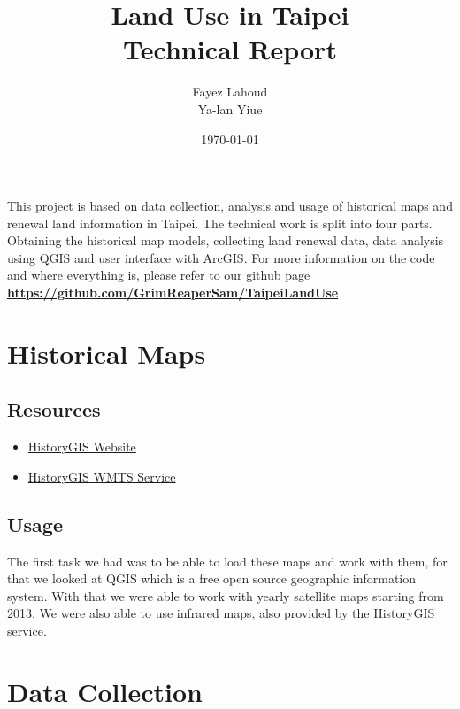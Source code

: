 \documentclass[12pt]{article}
\title{Land Use in Taipei \\
		\large Technical Report}
\author{Fayez Lahoud \\ Ya-lan Yiue}
\date{\today}
\begin{document}
\maketitle

This project is based on data collection, analysis and usage of historical maps and renewal land information in Taipei. The technical work is split into four parts. Obtaining the historical map models, collecting land renewal data, data analysis using QGIS and user interface with ArcGIS. For more information on the code and where everything is, please refer to our github page \textbf{\href{https://github.com/GrimReaperSam/TaipeiLandUse}{https://github.com/GrimReaperSam/TaipeiLandUse}}

\section{Historical Maps}
\subsection{Resources}
\begin{itemize}
\item \href{http://www.historygis.udd.taipei.gov.tw/urban/map/}{HistoryGIS Website}
\item \href{http://www.historygis.udd.gov.taipei/arcgis/rest/services}{HistoryGIS WMTS Service}
\end{itemize}

\subsection{Usage}
The first task we had was to be able to load these maps and work with them, for that we looked at QGIS which is a free open source geographic information system. With that we were able to work with yearly satellite maps starting from 2013. We were also able to use infrared maps, also provided by the HistoryGIS service.

\section{Data Collection}
\end{document}
